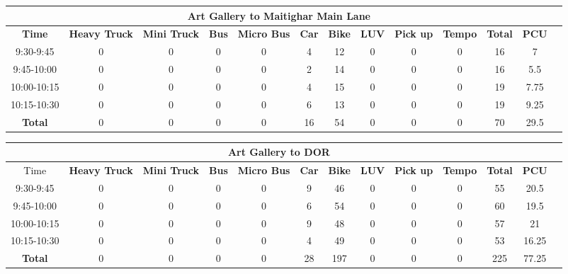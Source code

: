 \begin{landscape}
\centering
\begin{table}[h!]
\centering
\begin{tabular}{|c|c|c|c|c|c|c|c|c|c|c|c|c|}
    \hline
    \multicolumn{12}{|c|}{\textbf{Art Gallery to Maitighar Main Lane}} \\
    \hline
    \textbf{Time} & \textbf{Heavy Truck} & \textbf{Mini Truck} & \textbf{Bus} & \textbf{Micro Bus} & \textbf{Car} & \textbf{Bike} & \textbf{LUV} & \textbf{Pick up} & \textbf{Tempo} & \textbf{\textbf{Total}} & \textbf{PCU} \\
    \hline
9:30-9:45	&0	&0	&0	&0	&4	&12	&0	&0	&0	&16	&7 \\ \hline
9:45-10:00	&0	&0	&0	&0	&2	&14	&0	&0	&0	&16	&5.5 \\ \hline
10:00-10:15	&0	&0	&0	&0	&4	&15	&0	&0	&0	&19	&7.75 \\ \hline
10:15-10:30	&0	&0	&0	&0	&6	&13	&0	&0	&0	&19	&9.25 \\ \hline
\textbf{Total}	&0	&0	&0	&0	&16	&54	&0	&0	&0	&70	&29.5 \\ \hline

\end{tabular}

\vspace{0.5cm}

\begin{tabular}{|c|c|c|c|c|c|c|c|c|c|c|c|c|}
    \hline
    \multicolumn{12}{|c|}{\textbf{Art Gallery to DOR}} \\
    \hline
        Time & \textbf{Heavy Truck} & \textbf{Mini Truck} & \textbf{Bus} & \textbf{Micro Bus} & \textbf{Car} & \textbf{Bike} & \textbf{LUV} & \textbf{Pick up} & \textbf{Tempo} & \textbf{\textbf{Total}} & \textbf{PCU} \\
    \hline
9:30-9:45	&0	&0	&0	&0	&9	&46	&0	&0	&0	&55	&20.5 \\ \hline
9:45-10:00	&0	&0	&0	&0	&6	&54	&0	&0	&0	&60	&19.5 \\ \hline
10:00-10:15	&0	&0	&0	&0	&9	&48	&0	&0	&0	&57	&21 \\ \hline
10:15-10:30	&0	&0	&0	&0	&4	&49	&0	&0	&0	&53	&16.25 \\ \hline
\textbf{Total}	&0	&0	&0	&0	&28	&197	&0	&0	&0	&225	&77.25 \\ \hline

\end{tabular}


\end{table}
\end{landscape}
